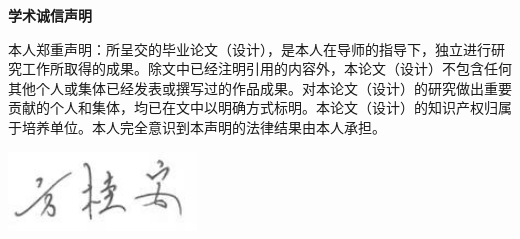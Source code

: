 \heiti\selectfont
\centering \textbf{学术诚信声明}
\songti\selectfont


本人郑重声明：所呈交的毕业论文（设计），是本人在导师的指导下，独立进行研究工作所取得的成果。除文中已经注明引用的内容外，本论文（设计）不包含任何其他个人或集体已经发表或撰写过的作品成果。对本论文（设计）的研究做出重要贡献的个人和集体，均已在文中以明确方式标明。本论文（设计）的知识产权归属于培养单位。本人完全意识到本声明的法律结果由本人承担。

\vspace{2\baselineskip}


\begin{flushright}
 \includegraphics[width=5cm]{image/Signature.jpg}\
\vspace{2\baselineskip}
 \makebox[5cm]{\hspace{1cm}\today}\
\end{flushright}





\endinput
